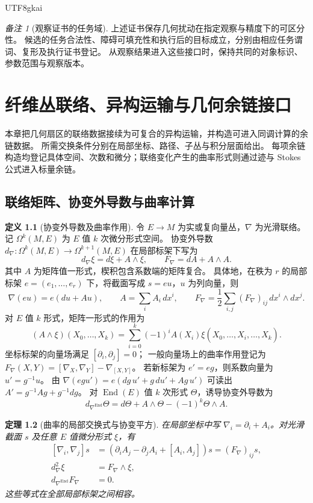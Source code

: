 \documentclass[12pt,a4paper,openany,notitlepage]{report}
\theoremstyle{plain}
\newtheorem{theorem}{定理}[chapter]
\theoremstyle{definition}
\newtheorem{definition}[theorem]{定义}
\theoremstyle{remark}
\newtheorem{remark}[theorem]{备注}
\begin{document}
\begin{CJK*}{UTF8}{gkai}
\begin{remark}[观察证书的任务域]
上述证书保存几何扰动在指定观察与精度下的可区分性。
候选的任务合法性、障碍可填充性和执行后的目标成立，分别由相应任务谓词、复形及执行证书登记。
从观察结果进入这些接口时，保持共同的对象标识、参数范围与观察版本。
\end{remark}


\chapter{纤维丛联络、异构运输与几何余链接口}
\label{exp:ch:transport}

本章把几何扇区的联络数据接续为可复合的异构运输，并构造可进入同调计算的余链数据。
所需交换条件分别在局部坐标、路径、子丛与积分层面给出。
每项余链构造均登记具体空间、次数和微分；联络变化产生的曲率形式则通过迹与 Stokes 公式进入标量余链。

\section{联络矩阵、协变外导数与曲率计算}
\label{hgov:geo:transport}

\begin{definition}[协变外导数及曲率作用]
\label{hgov:geo:def:exterior}
令 $E\to M$ 为实或复向量丛，$\nabla$ 为光滑联络。
记 $\Omega^k(M,E)$ 为 $E$ 值 $k$ 次微分形式空间。
协变外导数
$d_\nabla:\Omega^k(M,E)\to\Omega^{k+1}(M,E)$
在局部标架下写为
\[
d_\nabla\xi=d\xi+A\wedge\xi,
\qquad F_\nabla=dA+A\wedge A.
\]
其中 $A$ 为矩阵值一形式，楔积包含系数端的矩阵复合。
具体地，在秩为 $r$ 的局部标架 $e=(e_1,\ldots,e_r)$ 下，将截面写成 $s=e u$，$u$ 为列向量，则
\[
\nabla(eu)=e(du+Au),\qquad
A=\sum_iA_i\,dx^i,
\qquad
F_\nabla=\frac12\sum_{i,j}(F_\nabla)_{ij}\,dx^i\wedge dx^j.
\]
对 $E$ 值 $k$ 形式，矩阵一形式的作用为
\[
(A\wedge\xi)(X_0,\ldots,X_k)
=\sum_{i=0}^k(-1)^iA(X_i)
\xi(X_0,\ldots,\widehat X_i,\ldots,X_k).
\]
坐标标架的向量场满足 $[\partial_i,\partial_j]=0$；
一般向量场上的曲率作用登记为
$F_\nabla(X,Y)=[\nabla_X,\nabla_Y]-\nabla_{[X,Y]}$。
若新标架为 $e'=e g$，则系数向量为 $u'=g^{-1}u$。
由 $\nabla(e g u')=e(dg\,u'+g\,du'+Ag\,u')$ 可读出
$A'=g^{-1}Ag+g^{-1}dg$。
对 $\operatorname{End}(E)$ 值 $k$ 次形式 $\Theta$，诱导协变外导数为
\[
d_{\nabla^{\operatorname{End}}}\Theta
=d\Theta+A\wedge\Theta-(-1)^k\Theta\wedge A.
\]
\end{definition}

\begin{theorem}[曲率的局部交换式与协变平方]
\label{hgov:geo:thm:curvature}
在局部坐标中写 $\nabla_i=\partial_i+A_i$。对光滑截面 $s$ 及任意 $E$ 值微分形式 $\xi$，有
\begin{align}
\label{hgov:geo:eq:commutator}
[\nabla_i,\nabla_j]s
&=(\partial_iA_j-\partial_jA_i+[A_i,A_j])s
=(F_\nabla)_{ij}s,\\
\label{hgov:geo:eq:covariant-square}
d_\nabla^2\xi&=F_\nabla\wedge\xi,\\
\label{hgov:geo:eq:bianchi}
d_{\nabla^{\operatorname{End}}}F_\nabla&=0.
\end{align}
这些等式在全部局部标架之间相容\cite{ExtKobayashiNomizu,ExtBottTu}。
\end{theorem}


\end{CJK*}
\end{document}
